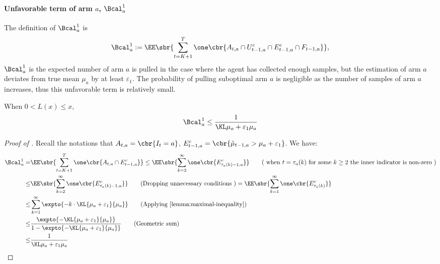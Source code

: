     \paragraph{Unfavorable term of arm $a$, $\Bcal^1_{a}$}
    The definition of $\Bcal^1_{a}$ is
    \[
        \Bcal^1_{a} := \EE\sbr{ \sum_{t=K+1}^T
        \one\cbr{ A_{t,a} \cap 
        U_{t-1,a}^c \cap
        E_{t-1,a}^c \cap
        F_{t-1,a}
        }},
    \]
    $\Bcal^1_{a}$ is the expected number of arm $a$ is pulled in the case where the agent has collected enough samples, but the estimation of arm $a$ deviates from true mean $\mu_a$ by at least $\varepsilon_1$.
    The probability of pulling suboptimal arm $a$ is negligible as the number of samples of arm $a$ increases, thus this unfavorable term is relatively small.

    \begin{proposition} \label{pro:bad-1}
    When $0 < L(x) \leq x$,
        \begin{align}
            \Bcal^1_{a} \leq \ExpFTwo
                \label{eqn:f2}
        \end{align}
    \end{proposition}

    \begin{proof}[Proof of ]
    Recall the notations that $A_{t,a} = \cbr{I_t = a}$, $E_{t-1,a}^c = \cbr{ \hmu_{t-1,a}>\mu_a+{\varepsilon_1} }$. We have:
    \begin{align}
        \Bcal^1_{a} =
        & 
        \EE\sbr{\sum_{t=K+1}^T 
            \one\cbr{
                A_{t,a} \cap
                E_{t-1,a}^c
                }} 
        \leq
            \EE\sbr{
            \sum_{k=2}^\infty 
            \one\cbr{
                E_{\tau_a(k)-1,a}^c
                }}
                \tag{
                when $t =\tau_a(k)$ for some $k \geq 2$ the inner indicator is non-zero
                }
        \\
        \leq & 
            \EE\sbr{
            \sum_{k=2}^\infty 
            \one\cbr{ E_{\tau_a(k)-1,a}^c }}
                \tag{Dropping unnecessary conditions
                }
        = 
            \EE\sbr{
            \sum_{k=1}^\infty 
            \one\cbr{ E_{\tau_a(k)}^c }}
        \\
        \leq &
            \sum_{k=1}^\infty
            \expto{- k\cdot \KL{\mu_a + \varepsilon_1}{\mu_a}}
                \tag{Applying \Cref{lemma:maximal-inequality}}
        \\
        \leq &
            \frac{\expto{- \KL{\mu_a + \varepsilon_1}{\mu_a}}}
                 {1 - \expto{- \KL{\mu_a + \varepsilon_1}{\mu_a} }}
                \tag{Geometric sum}
        \\
        \leq &
            \ExpFTwo
                \label{eqn:F_2_upper_bound}
        \end{align}
    \end{proof}

